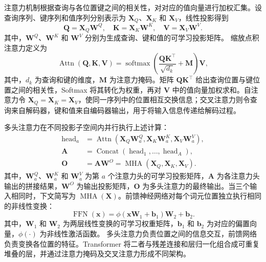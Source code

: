 注意力机制根据查询与各位置键之间的相关性，对对应的值向量进行加权汇集。设查询序列、键序列和值序列分别表示为 $\mathbf{X}_Q$、$\mathbf{X}_K$ 和 $\mathbf{X}_V$，线性投影得到
\begin{equation}
    \mathbf{Q}=\mathbf{X}_Q\mathbf{W}^{Q},\quad
    \mathbf{K}=\mathbf{X}_K\mathbf{W}^{K},\quad
    \mathbf{V}=\mathbf{X}_V\mathbf{W}^{V}.
\end{equation}
其中，$\mathbf{W}^{Q}$、$\mathbf{W}^{K}$ 和 $\mathbf{W}^{V}$ 分别为生成查询、键和值的可学习投影矩阵。
缩放点积注意力定义为\cite{vaswani2017attention}
\begin{equation}
    \operatorname{Attn}(\mathbf{Q},\mathbf{K},\mathbf{V})
    =\operatorname{softmax}\left(
      \frac{\mathbf{Q}\mathbf{K}^{\top}}{\sqrt{d_k}}+\mathbf{M}\right)\mathbf{V},
    \label{eq:bg_attention}
\end{equation}
其中，$d_k$ 为查询和键的维度，$\mathbf{M}$ 为注意力掩码。矩阵 $\mathbf{Q}\mathbf{K}^{\top}$ 给出查询位置与键位置之间的相关性，Softmax 将其转化为权重，再对 $\mathbf{V}$ 中的值向量加权求和。自注意力令 $\mathbf{X}_Q=\mathbf{X}_K=\mathbf{X}_V$，使同一序列中的位置相互交换信息；交叉注意力则令查询来自解码器，键和值来自编码器输出，用于将输入信息传递给解码过程。

多头注意力在不同投影子空间内并行执行上述计算：
\begin{align}
    \operatorname{head}_a
      &=\operatorname{Attn}(\mathbf{X}_Q\mathbf{W}_a^Q,
         \mathbf{X}_K\mathbf{W}_a^K,\mathbf{X}_V\mathbf{W}_a^V),\\
    \mathbf{A}
      &=\operatorname{Concat}(\operatorname{head}_1,\ldots,
         \operatorname{head}_{A}),\\
    \mathbf{O}
      &=\mathbf{A}\mathbf{W}^{O}
       =\operatorname{MHA}(\mathbf{X}_Q,\mathbf{X}_K,\mathbf{X}_V).
    \label{eq:bg_mha}
\end{align}
其中，$\mathbf{W}_a^Q$、$\mathbf{W}_a^K$ 和 $\mathbf{W}_a^V$ 为第 $a$ 个注意力头的可学习投影矩阵，$\mathbf{A}$ 为各注意力头输出的拼接结果，$\mathbf{W}^{O}$ 为输出投影矩阵，$\mathbf{O}$ 为多头注意力的最终输出。当三个输入相同时，下文简写为 $\operatorname{MHA}(\mathbf{X})$。前馈神经网络对每个词元位置独立执行相同的非线性变换：
\begin{equation}
    \operatorname{FFN}(\mathbf{x})
    =\phi(\mathbf{x}\mathbf{W}_1+\mathbf{b}_1)\mathbf{W}_2+\mathbf{b}_2.
    \label{eq:bg_ffn}
\end{equation}
其中，$\mathbf{W}_1$ 和 $\mathbf{W}_2$ 为两层线性变换的可学习权重矩阵，$\mathbf{b}_1$ 和 $\mathbf{b}_2$ 为对应的偏置向量，$\phi(\cdot)$ 为非线性激活函数。
多头注意力负责位置之间的信息交互，前馈网络负责变换各位置的特征。Transformer 将二者与残差连接和层归一化组合成可重复堆叠的层，并通过注意力掩码及交叉注意力形成不同架构。


